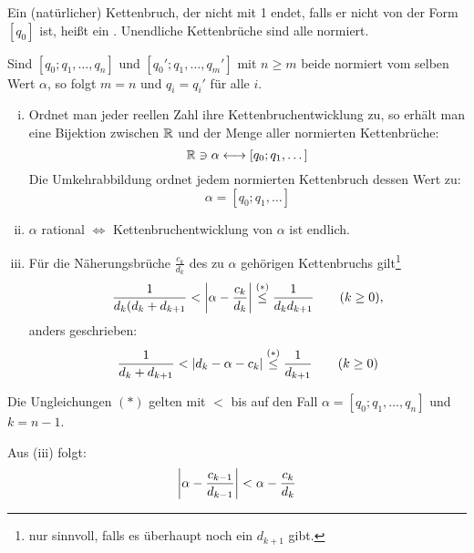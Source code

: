 \begin{defn}
	Ein (natürlicher) Kettenbruch, der nicht mit 1 endet, falls er nicht von der Form $[q_0]$ ist, heißt ein . Unendliche Kettenbrüche sind alle normiert.
\end{defn}

	Sind $[q_0;q_1,\dots,q_n]$ und $[q_0';q_1,\dots,q_m']$ mit $n \geq m$ beide normiert vom selben Wert $\alpha$, so folgt $m = n$ und $q_i = q_i'$ für alle $i$.
	
\begin{satz} \label{satz_2.2}
	\begin{enumerate}[(i)]
		\item Ordnet man jeder reellen Zahl ihre Kettenbruchentwicklung zu, so erhält man eine Bijektion zwischen $\RR$ und der Menge aller normierten Kettenbrüche:
		\begin{equation}
			\RR \ni \alpha \longleftrightarrow [q_0;q_1,\dots] \label{eq_2.35}
		\end{equation}
		Die Umkehrabbildung ordnet jedem normierten Kettenbruch dessen Wert zu:
		\[ \alpha = [q_0;q_1,\dots] \]
		\item $\alpha$ rational $\Leftrightarrow$ Kettenbruchentwicklung von $\alpha$ ist endlich.
		\item Für die Näherungsbrüche $\frac{c_k}{d_k}$ des zu $\alpha$ gehörigen Kettenbruchs gilt\footnote{nur sinnvoll, falls es überhaupt noch ein $d_{k+1}$ gibt.}
		\begin{equation}
			\frac{1}{d_k(d_k+d_{k+1}} < \abs*{\alpha - \frac{c_k}{d_k}} \stackrel{(*)}{\leq} \frac{1}{d_k d_{k+1}} \qquad (k \geq 0), \label{eq_2.36}
		\end{equation}
		anders geschrieben:
		\begin{equation}
			\frac{1}{d_k + d_{k+1}} < \abs{d_k-\alpha - c_k} \stackrel{(*)}{\leq} \frac{1}{d_{k+1}} \qquad (k \geq 0) \label{eq_2.37}
		\end{equation}
	\end{enumerate}
\end{satz}

	Die Ungleichungen $(*)$ gelten mit $<$ bis auf den Fall $\alpha = [q_0;q_1,\dots,q_n]$ und $k = n-1$.

	Aus (iii) folgt:
	\begin{equation}
		\abs*{ \alpha - \frac{c_{k-1}}{d_{k-1}}} < \alpha - \frac{c_k}{d_k} \label{eq_2.44}
	\end{equation}
	
